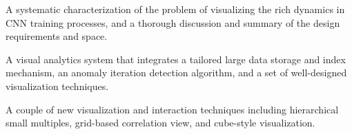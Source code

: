\documentclass[format=acmsmall, review=false, screen=true]{acmart}
\begin{document}
\begin{compactitem}
	\item A systematic characterization of the problem of visualizing the rich dynamics in CNN training processes, and a thorough discussion and summary of the design requirements and space.
	\item A visual analytics system that integrates a tailored large data storage and index mechanism, an anomaly iteration detection algorithm, and a set of well-designed visualization techniques.
	\item A couple of new visualization and interaction techniques including hierarchical small multiples, grid-based correlation view, and cube-style visualization.
\end{compactitem}%
\end{document}
